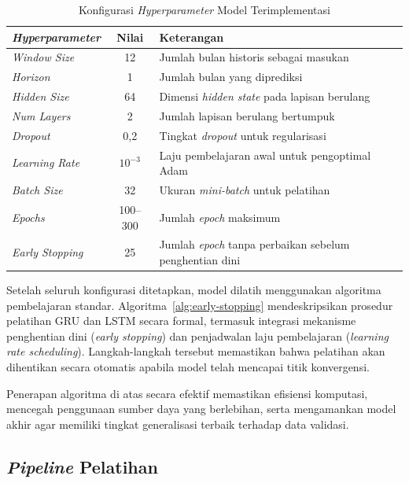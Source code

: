 \begin{table}[htbp]
\centering
\caption{Konfigurasi \textit{Hyperparameter} Model Terimplementasi}
\label{tab:hyperparameter-impl}
\begin{tabular}{|p{4cm}|c|p{6.5cm}|}
\hline
\textbf{\textit{Hyperparameter}} & \textbf{Nilai} & \textbf{Keterangan} \\
\hline
\textit{Window Size} & 12 & Jumlah bulan historis sebagai masukan \\
\hline
\textit{Horizon} & 1 & Jumlah bulan yang diprediksi \\
\hline
\textit{Hidden Size} & 64 & Dimensi \textit{hidden state} pada lapisan berulang \\
\hline
\textit{Num Layers} & 2 & Jumlah lapisan berulang bertumpuk \\
\hline
\textit{Dropout} & 0,2 & Tingkat \textit{dropout} untuk regularisasi \\
\hline
\textit{Learning Rate} & $10^{-3}$ & Laju pembelajaran awal untuk pengoptimal Adam \\
\hline
\textit{Batch Size} & 32 & Ukuran \textit{mini-batch} untuk pelatihan \\
\hline
\textit{Epochs} & 100--300 & Jumlah \textit{epoch} maksimum \\
\hline
\textit{Early Stopping} & 25 & Jumlah \textit{epoch} tanpa perbaikan sebelum penghentian dini \\
\hline
\end{tabular}
\end{table}

Setelah seluruh konfigurasi ditetapkan, model dilatih menggunakan algoritma pembelajaran standar. Algoritma~\ref{alg:early-stopping} mendeskripsikan prosedur pelatihan GRU dan LSTM secara formal, termasuk integrasi mekanisme penghentian dini (\textit{early stopping}) dan penjadwalan laju pembelajaran (\textit{learning rate scheduling}). Langkah-langkah tersebut memastikan bahwa pelatihan akan dihentikan secara otomatis apabila model telah mencapai titik konvergensi.



Penerapan algoritma di atas secara efektif memastikan efisiensi komputasi, mencegah penggunaan sumber daya yang berlebihan, serta mengamankan model akhir agar memiliki tingkat generalisasi terbaik terhadap data validasi.

\subsection{\textit{Pipeline} Pelatihan}
\label{subsec:pipeline-pelatihan}

